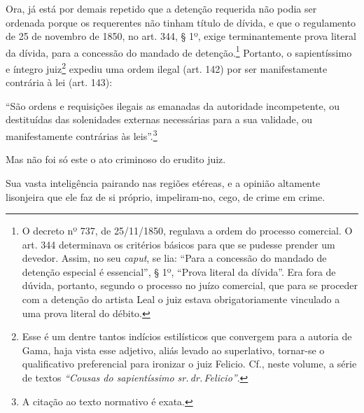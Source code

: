 Ora, já está por demais repetido que a detenção requerida não podia ser
ordenada porque os requerentes não tinham título de dívida, e que o
regulamento de 25 de novembro de 1850, no art. 344, § 1º, exige
terminantemente prova literal da dívida, para a concessão do mandado de
detenção.\footnote{ O decreto nº 737, de 25/11/1850, regulava a ordem
  do processo comercial. O art. 344 determinava os critérios básicos
  para que se pudesse prender um devedor. Assim, no seu \emph{caput}, se
  lia: ``Para a concessão do mandado de detenção especial é essencial'', §
  1º, ``Prova literal da dívida''. Era fora de dúvida, portanto, segundo o
  processo no juízo comercial, que para se proceder com a detenção do
  artista Leal o juiz estava obrigatoriamente vinculado a uma prova
  literal do débito.} Portanto, o sapientíssimo e íntegro
juiz\footnote{ Esse é um dentre tantos indícios estilísticos que
  convergem para a autoria de Gama, haja vista esse adjetivo, aliás
  levado ao superlativo, tornar-se o qualificativo preferencial para
  ironizar o juiz Felicio. Cf., neste volume, a série de textos
  \emph{``Cousas do sapientíssimo sr.\,dr.\,Felicio''}.} expediu uma ordem
ilegal (art. 142) por ser manifestamente contrária à lei (art. 143):

``São ordens e requisições ilegais as emanadas da autoridade
incompetente, ou destituídas das solenidades externas necessárias para a
sua validade, ou manifestamente contrárias às leis''.\footnote{ A
  citação ao texto normativo é exata.}

Mas não foi só este o ato criminoso do erudito juiz.

Sua vasta inteligência pairando nas regiões etéreas, e a opinião
altamente lisonjeira que ele faz de si próprio, impeliram-no, cego, de
crime em crime.

